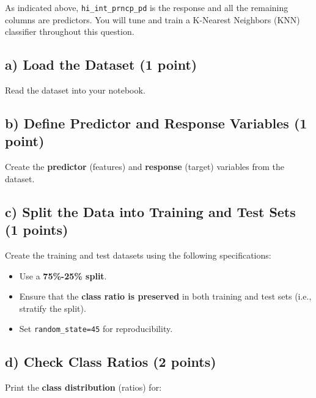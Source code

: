 \documentclass[
  letterpaper,
  DIV=11,
  numbers=noendperiod]{scrreprt}
\providecommand{\tightlist}{%
  \setlength{\itemsep}{0pt}\setlength{\parskip}{0pt}}\usepackage{longtable,booktabs,array}
\begin{document}
As indicated above, \texttt{hi\_int\_prncp\_pd} is the response and all
the remaining columns are predictors. You will tune and train a
K-Nearest Neighbors (KNN) classifier throughout this question.

\subsection{\texorpdfstring{a) Load the Dataset \textbf{(1
point)}}{a) Load the Dataset (1 point)}}\label{a-load-the-dataset-1-point}

Read the dataset into your notebook.

\subsection{\texorpdfstring{b) Define Predictor and Response Variables
\textbf{(1
point)}}{b) Define Predictor and Response Variables (1 point)}}\label{b-define-predictor-and-response-variables-1-point}

Create the \textbf{predictor} (features) and \textbf{response} (target)
variables from the dataset.

\subsection{\texorpdfstring{c) Split the Data into Training and Test
Sets \textbf{(1
points)}}{c) Split the Data into Training and Test Sets (1 points)}}\label{c-split-the-data-into-training-and-test-sets-1-points}

Create the training and test datasets using the following
specifications:

\begin{itemize}
\tightlist
\item
  Use a \textbf{75\%-25\% split}.
\item
  Ensure that the \textbf{class ratio is preserved} in both training and
  test sets (i.e., stratify the split).
\item
  Set \texttt{random\_state=45} for reproducibility.
\end{itemize}

\subsection{\texorpdfstring{d) Check Class Ratios \textbf{(2
points)}}{d) Check Class Ratios (2 points)}}\label{d-check-class-ratios-2-points}

Print the \textbf{class distribution} (ratios) for:
\end{document}
